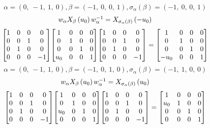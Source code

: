 \documentclass[11pt]{article}
\theoremstyle{definition}
\begin{document}
\[
\alpha = \left( 0, \  -1, \  1, \  0\right), \beta = \left( -1, \  0, \  0, \  1\right), \sigma_{\alpha}(\beta) = \left( -1, \  0, \  0, \  1\right)
\]
\[
\scaletoalign{\textwidth}{w_{\alpha} X_{\beta}\left(u_{0}\right) w_{\alpha}^{-1} = X_{\sigma_{\alpha}\left(\beta\right)}\left(- u_{0}\right)}
\]
\[
\scaletoalign{\textwidth}{{\left[\begin{matrix}1 & 0 & 0 & 0\\0 & 0 & 1 & 0\\0 & 1 & 0 & 0\\0 & 0 & 0 & -1\end{matrix}\right]} {\left[\begin{matrix}1 & 0 & 0 & 0\\0 & 1 & 0 & 0\\0 & 0 & 1 & 0\\u_{0} & 0 & 0 & 1\end{matrix}\right]} {\left[\begin{matrix}1 & 0 & 0 & 0\\0 & 0 & 1 & 0\\0 & 1 & 0 & 0\\0 & 0 & 0 & -1\end{matrix}\right]} = {\left[\begin{matrix}1 & 0 & 0 & 0\\0 & 1 & 0 & 0\\0 & 0 & 1 & 0\\- u_{0} & 0 & 0 & 1\end{matrix}\right]}}
\]
\[
\alpha = \left( 0, \  -1, \  1, \  0\right), \beta = \left( -1, \  0, \  1, \  0\right), \sigma_{\alpha}(\beta) = \left( -1, \  1, \  0, \  0\right)
\]
\[
\scaletoalign{\textwidth}{w_{\alpha} X_{\beta}\left(u_{0}\right) w_{\alpha}^{-1} = X_{\sigma_{\alpha}\left(\beta\right)}\left(u_{0}\right)}
\]
\[
\scaletoalign{\textwidth}{{\left[\begin{matrix}1 & 0 & 0 & 0\\0 & 0 & 1 & 0\\0 & 1 & 0 & 0\\0 & 0 & 0 & -1\end{matrix}\right]} {\left[\begin{matrix}1 & 0 & 0 & 0\\0 & 1 & 0 & 0\\u_{0} & 0 & 1 & 0\\0 & 0 & 0 & 1\end{matrix}\right]} {\left[\begin{matrix}1 & 0 & 0 & 0\\0 & 0 & 1 & 0\\0 & 1 & 0 & 0\\0 & 0 & 0 & -1\end{matrix}\right]} = {\left[\begin{matrix}1 & 0 & 0 & 0\\u_{0} & 1 & 0 & 0\\0 & 0 & 1 & 0\\0 & 0 & 0 & 1\end{matrix}\right]}}
\]
\end{document}

